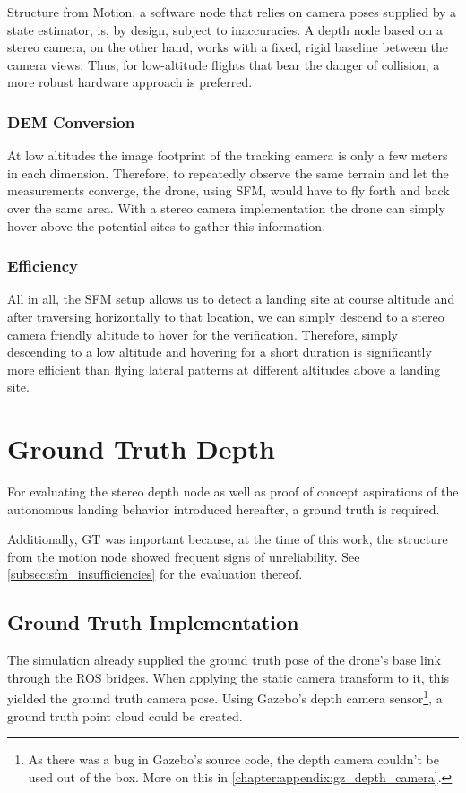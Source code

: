 Structure from Motion, a software node that relies on camera poses supplied by a state estimator, is, by design, subject to inaccuracies. A depth node based on a stereo camera, on the other hand, works with a fixed, rigid baseline between the camera views. Thus, for low-altitude flights that bear the danger of collision, a more robust hardware approach is preferred.

\subsubsection{DEM Conversion}

At low altitudes the image footprint of the tracking camera is only a few meters in each dimension. Therefore, to repeatedly observe the same terrain and let the measurements converge, the drone, using SFM,  would have to fly forth and back over the same area. With a stereo camera implementation the drone can simply hover above the potential sites to gather this information.

\subsubsection{Efficiency}

All in all, the SFM setup allows us to detect a landing site at course altitude and after traversing horizontally to that location, we can simply descend to a stereo camera friendly altitude to hover for the verification. Therefore, simply descending to a low altitude and hovering for a short duration is significantly more efficient than flying lateral patterns at different altitudes above a landing site.

\section{Ground Truth Depth}

For evaluating the stereo depth node as well as proof of concept aspirations of the autonomous landing behavior introduced hereafter, a ground truth is required. 

Additionally, GT was important because, at the time of this work, the structure from the motion node showed frequent signs of unreliability. See \cref{subsec:sfm_insufficiencies} for the evaluation thereof.

\subsection{Ground Truth Implementation}
The simulation already supplied the ground truth pose of the drone's base link through the ROS bridges. When applying the static camera transform to it, this yielded the ground truth camera pose. Using Gazebo's depth camera sensor\footnote[3]{As there was a bug in Gazebo's source code, the depth camera couldn't be used out of the box. More on this in \cref{chapter:appendix:gz_depth_camera}.}, a ground truth point cloud could be created.

